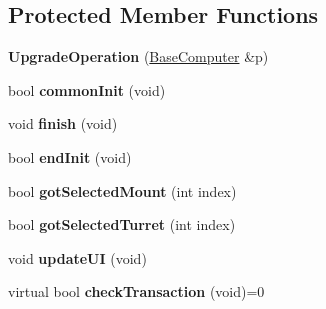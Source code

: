 \subsection*{Protected Member Functions}
\begin{DoxyCompactItemize}
\item 
{\bfseries Upgrade\+Operation} (\hyperlink{classBaseComputer}{Base\+Computer} \&p)\hypertarget{classBaseComputer_1_1UpgradeOperation_a4c3f30557d04e07a023d8af4dae33747}{}\label{classBaseComputer_1_1UpgradeOperation_a4c3f30557d04e07a023d8af4dae33747}

\item 
bool {\bfseries common\+Init} (void)\hypertarget{classBaseComputer_1_1UpgradeOperation_ad2d32883d463540dd33423be92076cb4}{}\label{classBaseComputer_1_1UpgradeOperation_ad2d32883d463540dd33423be92076cb4}

\item 
void {\bfseries finish} (void)\hypertarget{classBaseComputer_1_1UpgradeOperation_aa264e4643eba9cbc8b9e99e45a949474}{}\label{classBaseComputer_1_1UpgradeOperation_aa264e4643eba9cbc8b9e99e45a949474}

\item 
bool {\bfseries end\+Init} (void)\hypertarget{classBaseComputer_1_1UpgradeOperation_a375aace6487d3eba77418ed8b7da6078}{}\label{classBaseComputer_1_1UpgradeOperation_a375aace6487d3eba77418ed8b7da6078}

\item 
bool {\bfseries got\+Selected\+Mount} (int index)\hypertarget{classBaseComputer_1_1UpgradeOperation_a7bad45e7f2a63291050f4e8e8b845350}{}\label{classBaseComputer_1_1UpgradeOperation_a7bad45e7f2a63291050f4e8e8b845350}

\item 
bool {\bfseries got\+Selected\+Turret} (int index)\hypertarget{classBaseComputer_1_1UpgradeOperation_a16a5c3b429f3d196de364347d094c129}{}\label{classBaseComputer_1_1UpgradeOperation_a16a5c3b429f3d196de364347d094c129}

\item 
void {\bfseries update\+UI} (void)\hypertarget{classBaseComputer_1_1UpgradeOperation_aae2d44196d2d146395ceb63585445754}{}\label{classBaseComputer_1_1UpgradeOperation_aae2d44196d2d146395ceb63585445754}

\item 
virtual bool {\bfseries check\+Transaction} (void)=0\hypertarget{classBaseComputer_1_1UpgradeOperation_afdcb0fb34eed13e8273110f0d5864f65}{}\label{classBaseComputer_1_1UpgradeOperation_afdcb0fb34eed13e8273110f0d5864f65}


\end{DoxyCompactItemize}
